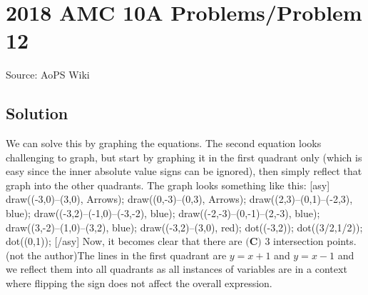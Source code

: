 \documentclass[12pt]{article}
\begin{document}
\section*{{2018 AMC 10A Problems/Problem 12}}
Source: AoPS Wiki

\subsection*{Solution}
We can solve this by graphing the equations. The second equation looks challenging to graph, but start by graphing it in the first quadrant only (which is easy since the inner absolute value signs can be ignored), then simply reflect that graph into the other quadrants. The graph looks something like this: [asy] draw((-3,0)--(3,0), Arrows); draw((0,-3)--(0,3), Arrows); draw((2,3)--(0,1)--(-2,3), blue); draw((-3,2)--(-1,0)--(-3,-2), blue); draw((-2,-3)--(0,-1)--(2,-3), blue); draw((3,-2)--(1,0)--(3,2), blue); draw((-3,2)--(3,0), red); dot((-3,2)); dot((3/2,1/2)); dot((0,1)); [/asy] Now, it becomes clear that there are $\boxed{\textbf{(C) } 3}$ intersection points. (not the author)The lines in the first quadrant are $y=x+1$ and $y=x-1$ and we reflect them into all quadrants as all instances of variables are in a context where flipping the sign does not affect the overall expression.
\end{document}
